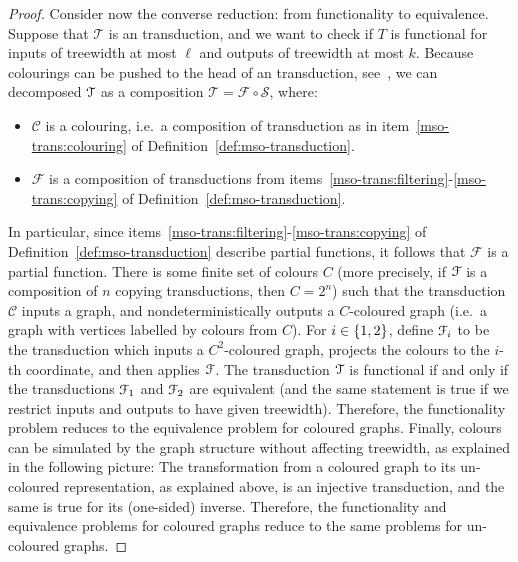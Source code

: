 \begin{proof}
    Consider now the converse reduction: from functionality to equivalence. Suppose that $\mathcal T$ is an \mso transduction, and we want to check if $T$ is functional for inputs of treewidth at most $\ell$ and outputs of treewidth at most $k$. Because colourings can be pushed to the head of an \mso transduction, see~\cite[Section 1.7]{courcelleGraphStructureMonadic2012}, we can decomposed ${\mathcal T}$ as a  composition $\mathcal T =  \mathcal F \circ \mathcal S$, where:
    \begin{itemize}
        \item $\mathcal C$ is a colouring, i.e.~a composition of transduction as in item~\ref{mso-trans:colouring} of Definition~\ref{def:mso-transduction}.
        \item $\mathcal F$ is a composition of transductions from items~\ref{mso-trans:filtering}-\ref{mso-trans:copying} of Definition~\ref{def:mso-transduction}.
    \end{itemize}
    In particular, since items~\ref{mso-trans:filtering}-\ref{mso-trans:copying} of Definition~\ref{def:mso-transduction} describe partial functions, it follows that $\mathcal F$ is a partial function. There is some finite set of colours $C$ (more precisely, if ${\mathcal F}$ is a composition of $n$ copying transductions, then $C=2^n$) such that the  transduction $\mathcal C$ inputs a graph, and nondeterministically outputs a $C$-coloured graph (i.e.~a graph with vertices labelled by colours from $C$). For $i  \in \{1,2\}$, define ${\mathcal F}_i$ to be the \mso transduction which inputs a $C^2$-coloured  graph, projects the colours to the $i$-th coordinate, and then applies ${\mathcal F}$. The transduction ${\mathcal T}$ is functional if and only if the transductions ${\mathcal F}_1$ and ${\mathcal F}_2$ are equivalent (and the same statement is true if we restrict inputs and outputs to have given treewidth). Therefore, the functionality problem reduces to the equivalence problem for coloured graphs. Finally, colours can be simulated by the graph structure without affecting treewidth,  as explained in the following picture:
    The transformation from a coloured graph to its un-coloured representation, as explained above, is an injective \mso transduction, and the same is true for its (one-sided) inverse. Therefore, the functionality and equivalence problems for coloured graphs reduce to the same problems for un-coloured graphs.

\end{proof}
